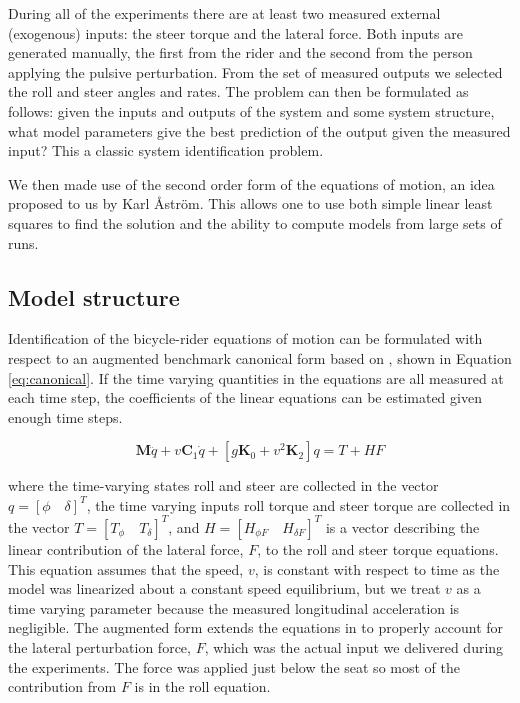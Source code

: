 \documentclass[a4paper]{article}
\begin{document}
During all of the experiments there are at least two measured external
(exogenous) inputs: the steer torque and the lateral force. Both inputs are
generated manually, the first from the rider and the second from the person
applying the pulsive perturbation. From the set of measured outputs we selected
the roll and steer angles and rates. The problem can then be formulated as
follows: given the inputs and outputs of the system and some system structure,
what model parameters give the best prediction of the output given the measured
input? This a classic system identification problem.


We then made use of the  second order form of the equations of motion, an idea
proposed to us by Karl Åström. This allows one to use both simple linear least
squares to find the solution and the ability to compute models from large sets
of runs.

\subsection{Model structure}

Identification of the bicycle-rider equations of motion can be formulated with
respect to an augmented benchmark canonical form based on \cite{Meijaard2007},
shown in Equation \ref{eq:canonical}. If the time varying quantities in the
equations are all measured at each time step, the coefficients of the linear
equations can be estimated given enough time steps.

\begin{equation}
  \mathbf{M} \ddot{q} + v \mathbf{C}_1 \dot{q} + [g \mathbf{K}_0 + v^2
  \mathbf{K}_2] q = T + H F
  \label{eq:canonical}
\end{equation}

where the time-varying states roll and steer are collected in the vector $q =
[\phi \quad \delta]^T$, the time varying inputs roll torque and steer torque
are collected in the vector $T = [T_\phi \quad T_\delta]^T$, and $H = [H_{\phi
F} \quad H_{\delta F}]^T$ is a vector describing the linear contribution of the
lateral force, $F$, to the roll and steer torque equations. This equation
assumes that the speed, $v$, is constant with respect to time as the model was
linearized about a constant speed equilibrium, but we treat $v$ as a time
varying parameter because the measured longitudinal acceleration is negligible.
The augmented form extends the equations in \cite{Meijaar2007} to properly
account for the lateral perturbation force, $F$, which was the actual input we
delivered during the experiments. The force was applied just below the seat so
most of the contribution from $F$ is in the roll equation.
\end{document}
